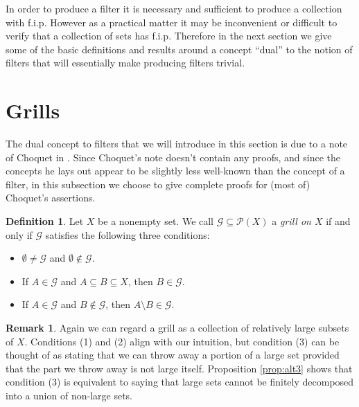 \documentclass[12pt]{article}
\theoremstyle{plain}
\theoremstyle{definition}
\newtheorem{defn}[thm]{Definition}
\newtheorem{rmk}[thm]{Remark}
\newcommand{\calG}{\mathcal{G}}
\newcommand{\calP}{\mathcal{P}}
\begin{document}
In order to produce a filter it is necessary and sufficient to produce a collection with f.i.p.
However as a practical matter it may be inconvenient or difficult to verify that a collection of sets has f.i.p.
Therefore in the next section we give some of the basic definitions and results around a concept ``dual'' to the notion of filters that will essentially make producing filters trivial.

\section{Grills}
The dual concept to filters that we will introduce in this section is due to a note of Choquet in \cite{Choquet:1947uq}. 
Since Choquet's note doesn't contain any proofs, and since the concepts he lays out appear to be slightly less well-known than the concept of a filter, in this subsection we choose to give complete proofs for (most of)%
Choquet's assertions.

\begin{defn}
  \label{defn:grill}
  Let $X$ be a nonempty set.
  We call $\calG \subseteq \calP(X)$ a \textsl{grill on $X$} if and only if $\calG$ satisfies the following three conditions:
      \begin{itemize}
        \item[(1)] $\emptyset \ne \calG$ and $\emptyset \not\in \calG$.

        \item[(2)] If $A \in \calG$ and $A \subseteq B \subseteq X$, then $B \in \calG$.

        \item[(3)] If $A \in \calG$ and $B \not\in \calG$, then $A \setminus B \in \calG$. 
      \end{itemize}
\end{defn}
\begin{rmk}
  Again we can regard a grill as a collection of relatively large subsets of $X$. 
  Conditions (1) and (2) align with our intuition, but condition (3) can be thought of as stating that we can throw away a portion of a large set provided that the part we throw away is not large itself.
  Proposition \ref{prop:alt3} shows that condition (3) is equivalent to saying that large sets cannot be finitely decomposed into a union of non-large sets.
\end{rmk}
\end{document}
